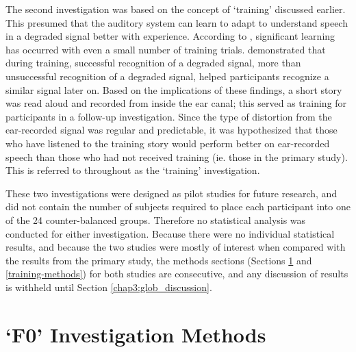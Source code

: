 The second investigation was based on the concept of `training' discussed earlier.  This presumed that the auditory system can learn to adapt to understand speech in a degraded signal better with experience.  According to \cite{mattys:12}, significant learning has occurred with even a small number of training trials.  \cite{davis:05} demonstrated that during training, successful recognition of a degraded signal, more than unsuccessful recognition of a degraded signal, helped participants recognize a similar signal later on.  
Based on the implications of these findings, a short story was read aloud and recorded from inside the ear canal; this served as training for participants in a follow-up investigation.  Since the type of distortion from the ear-recorded signal was regular and predictable, it was hypothesized that those who have listened to the training story would perform better on ear-recorded speech than those who had not received training (ie. those in the primary study). This is referred to throughout as the `training' investigation.

These two investigations were designed as pilot studies for future research, and did not contain the number of subjects required to place each participant into one of the 24 counter-balanced groups.  Therefore no statistical analysis was conducted for either investigation.  %
Because there were no individual statistical results, and because the two studies were mostly of interest when compared with the results from the primary study, the methods sections (Sections \ref{F0-methods} and \ref{training-methods}) for both studies are consecutive, and any discussion of results is withheld until Section \ref{chap3:glob_discussion}.



\section{`F0' Investigation Methods}
\label{F0-methods}

